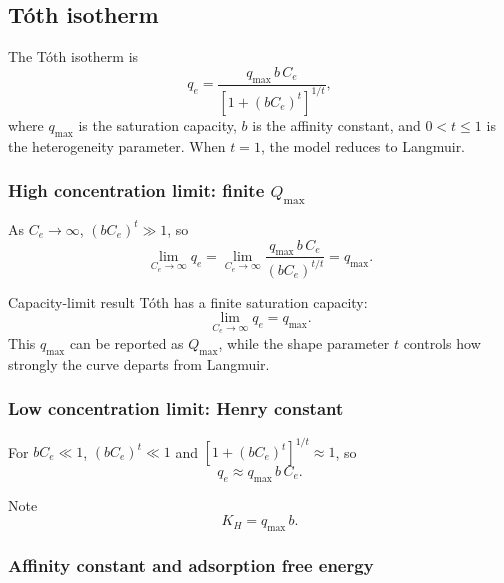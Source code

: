 \documentclass[journal=jacsat,manuscript=article]{achemso}
\begin{document}
\subsection{T\'{o}th isotherm}
\label{sec:si_toth}

The T\'{o}th isotherm is
\begin{equation}
	q_e = \frac{q_{\max}\, b\, C_e}{\left[1 + (b C_e)^t\right]^{1/t}},
	\label{eq:si_toth}
\end{equation}
where $q_{\max}$ is the saturation capacity, $b$ is the affinity
constant, and $0 < t \leq 1$ is the heterogeneity parameter.
When $t = 1$, the model reduces to Langmuir.

\subsubsection{High concentration limit: finite $Q_{\max}$}

As $C_e \to \infty$, $(bC_e)^t \gg 1$, so
\begin{equation}
	\lim_{C_e \to \infty} q_e
	= \lim_{C_e \to \infty}
	\frac{q_{\max}\, b\, C_e}{(b C_e)^{t/t}}
	= q_{\max}.
\end{equation}
\begin{greenbox}{Capacity-limit result}
	T\'{o}th has a finite saturation capacity:
	\begin{equation}
		\lim_{C_e \to \infty} q_e = q_{\max}.
	\end{equation}
	This \(q_{\max}\) can be reported as \(Q_{\max}\), while the shape
	parameter \(t\) controls how strongly the curve departs from Langmuir.
\end{greenbox}

\subsubsection{Low concentration limit: Henry constant}

For $bC_e \ll 1$, $(bC_e)^t \ll 1$ and $[1+(bC_e)^t]^{1/t} \approx 1$, so
\begin{equation}
	q_e \approx q_{\max}\, b\, C_e.
\end{equation}


\begin{bluebox}{Note}
	\begin{equation}
		K_H = q_{\max}\, b.
	\end{equation}
\end{bluebox}

\subsubsection{Affinity constant and adsorption free energy}
\end{document}

